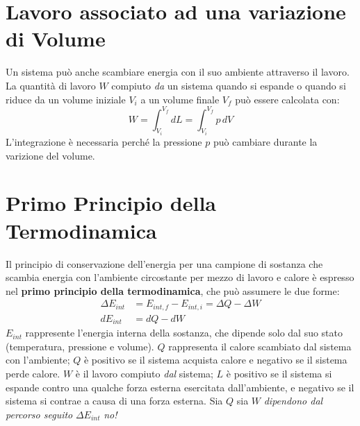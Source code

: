     \section{Lavoro associato ad una variazione di Volume} Un sistema può anche
    scambiare energia con il suo ambiente attraverso il lavoro. La quantità di 
    lavoro $W$ compiuto \textit{da} un sistema quando si espande o quando si 
    riduce da un volume iniziale $V_i$ a un volume finale $V_f$ può essere 
    calcolata con:
        \begin{equation}
            W = \int_{V_i}^{V_f} dL =  \int_{V_i}^{V_f} p \,dV  
        \end{equation}
    L'integrazione è necessaria perché la pressione $p$ può cambiare durante la
    varizione del volume.

    \section{Primo Principio della Termodinamica} Il principio di conservazione
    dell'energia per una campione di sostanza che scambia energia con 
    l'ambiente circostante per mezzo di lavoro e calore è espresso nel \textbf{
    primo principio della termodinamica}, che può assumere le due forme:
        \begin{align}
            \Delta E_{int} &= E_{int, f} - E_{int, i} = \Delta Q - \Delta W \\
            d E_{int} &= d Q - d W
        \end{align}
    $E_{int}$ rappresente l'energia interna della sostanza, che dipende solo 
    dal suo stato (temperatura, pressione e volume). $Q$ rappresenta il calore
    scambiato dal sistema con l'ambiente; $Q$ è positivo se il sistema acquista
    calore e negativo se il sistema perde calore. $W$ è il lavoro compiuto
    \textit{dal} sistema; $L$ è positivo se il sistema si espande contro una 
    qualche forza esterna esercitata dall'ambiente, e negativo se il sistema si
    contrae a causa di una forza esterna. Sia $Q$ sia $W$ \textit{dipendono dal
    percorso seguito} $\Delta E_{int}$ \textit{no!}

